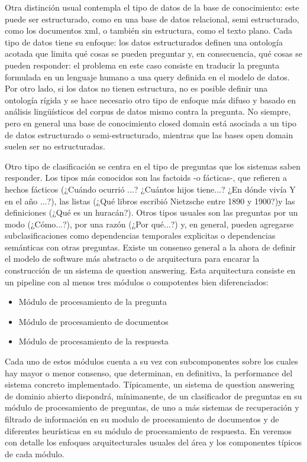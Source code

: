 Otra distinción usual contempla el tipo de datos de la base de conocimiento: este puede ser estructurado, como en una base de datos
relacional, semi estructurado, como los documentos xml, o también sin estructura, como el texto plano. Cada tipo de datos tiene su enfoque:
los datos estructurados definen una ontología acotada que limita qué cosas se pueden preguntar y, en consecuencia, qué cosas se pueden responder: el problema en este caso consiste en traducir la pregunta formulada en un lenguaje humano a una query definida en el modelo de datos. Por otro lado, si los datos no tienen estructura, no es posible definir una ontología rígida y se hace necesario otro tipo de enfoque más difuso y basado en análisis lingüísticos del corpus de datos mismo contra la pregunta. No siempre,  pero en general una base de conocimiento closed domain está asociada a un tipo de datos estructurado o semi-estructurado, mientras que las bases open domain
suelen ser no estructuradas.

Otro tipo de clasificación se centra en el tipo de preguntas que los sistemas saben responder. Los tipos más conocidos son las factoids -o fácticas-, que refieren a hechos fácticos (¿Cuándo ocurrió ...? ¿Cuántos hijos tiene...? ¿En dónde vivía Y en el año ...?), las listas (¿Qué libros escribió Nietzsche entre 1890 y 1900?)y las definiciones (¿Qué es un huracán?). Otros tipos usuales son las preguntas por un modo (¿Cómo...?), por una razón (¿Por qué...?) y, en general, pueden agregarse subclasificaciones como dependencias temporales explicitas o dependencias semánticas con otras preguntas.
Existe un consenso general a la ahora de definir el modelo de software más abstracto o de arquitectura para encarar la construcción de un sistema de question answering. Esta arquitectura consiste en un pipeline con al menos tres módulos o compotentes bien diferenciados:
\begin{itemize}
\item Módulo de procesamiento de la pregunta
\item Módulo de procesamiento de documentos
\item Módulo de procesamiento de la respuesta
\end{itemize}
Cada uno de estos módulos cuenta a su vez con subcomponentes sobre los cuales hay mayor o menor consenso, que determinan, en definitiva, la performance del sistema concreto implementado. Típicamente, un sistema de question answering de dominio abierto dispondrá, mínimanente, de un clasificador de preguntas en su módulo de procesamiento de preguntas, de uno a más sistemas de recuperación y filtrado de información en su modulo de procesamiento de documentos y de diferentes heurísticas en su módulo de procesamiento de respuesta. En  veremos con detalle los enfoques arquitecturales usuales del área y los componentes típicos de cada módulo. 


